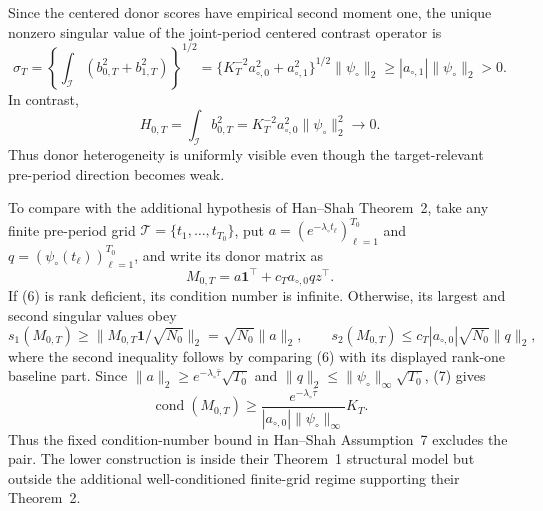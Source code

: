 Since the centered donor scores have empirical second moment one, the unique nonzero singular value of the joint-period centered contrast operator is
\[
 \sigma_T
 =\left\{\int_{\mathcal I}(b_{0,T}^2+b_{1,T}^2)\right\}^{1/2}
 =\{K_T^{-2}a_{\circ,0}^2+a_{\circ,1}^2\}^{1/2}
   \|\psi_\circ\|_2
 \ge |a_{\circ,1}|\|\psi_\circ\|_2>0.                 \tag{4}
\]
In contrast,
\[
 H_{0,T}=\int_{\mathcal I}b_{0,T}^2
 =K_T^{-2}a_{\circ,0}^2\|\psi_\circ\|_2^2\longrightarrow0. \tag{5}
\]
Thus donor heterogeneity is uniformly visible even though the target-relevant pre-period direction becomes weak.

To compare with the additional hypothesis of Han--Shah Theorem~2, take any finite pre-period grid \(\mathcal T=\{t_1,\ldots,t_{T_0}\}\), put \(a=(e^{-\lambda_\circ t_\ell})_{\ell=1}^{T_0}\) and \(q=(\psi_\circ(t_\ell))_{\ell=1}^{T_0}\), and write its donor matrix as
\[
 M_{0,T}=a\mathbf1^\top+c_Ta_{\circ,0}qz^\top.           \tag{6}
\]
If (6) is rank deficient, its condition number is infinite.  Otherwise, its largest and second singular values obey
\[
 s_1(M_{0,T})\ge\|M_{0,T}\mathbf1/\sqrt{N_0}\|_2
 =\sqrt{N_0}\|a\|_2,
 \qquad
 s_2(M_{0,T})\le c_T|a_{\circ,0}|\sqrt{N_0}\|q\|_2,    \tag{7}
\]
where the second inequality follows by comparing (6) with its displayed rank-one baseline part.  Since
\(\|a\|_2\ge e^{-\lambda_\circ\bar\tau}\sqrt{T_0}\) and
\(\|q\|_2\le\|\psi_\circ\|_\infty\sqrt{T_0}\), (7) gives
\[
 \operatorname{cond}(M_{0,T})
 \ge \frac{e^{-\lambda_\circ\bar\tau}}
 {|a_{\circ,0}|\|\psi_\circ\|_\infty}K_T.             \tag{8}
\]
Thus the fixed condition-number bound in Han--Shah Assumption~7 excludes the pair.  The lower construction is inside their Theorem~1 structural model but outside the additional well-conditioned finite-grid regime supporting their Theorem~2.

